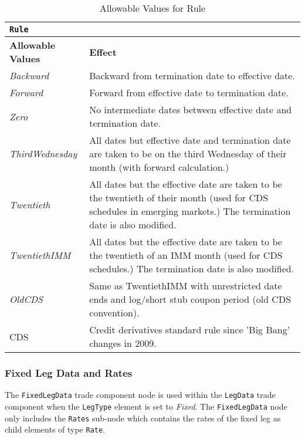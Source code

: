 \begin{table}[H]
\centering
\begin{tabular}{|l|p{6cm}|}
\hline
\multicolumn{2}{|l|}{\lstinline!Rule!}                    \\ \hline
\textbf{Allowable Values}                   & \textbf{Effect}                       \\ \hline
\emph{Backward}   &   Backward from termination date to effective date.   \\ \hline
\emph{Forward}   &   Forward from effective date to termination date.  \\ \hline
\emph{Zero}   &   No intermediate dates between effective date and termination date.  \\ \hline
\emph{ThirdWednesday}   &   All dates but effective date and
                          termination date are taken to be on the
                          third Wednesday of their month (with forward calculation.) \\ \hline
\emph{Twentieth}   &   All dates but the effective date are taken to be the twentieth of their month (used for CDS schedules in emerging markets.)  The termination date is also modified. \\ \hline
\emph{TwentiethIMM}   &   All dates but the effective date are  taken to be the twentieth of an IMM month (used for CDS schedules.)  The termination date is also modified. \\ \hline
\emph{OldCDS}   &   Same as TwentiethIMM with unrestricted date ends and log/short stub coupon period (old CDS convention).\\ \hline
CDS   &   Credit derivatives standard rule since 'Big Bang' changes in 2009.\\ \hline
\end{tabular}
  \caption{Allowable Values for Rule}
  \label{tab:rule}
\end{table}

\subsubsection{Fixed Leg Data and Rates}
\label{ss:fixedleg_data}

The \lstinline!FixedLegData! trade component node is used within the \lstinline!LegData! trade component when the
\lstinline!LegType! element is set to \emph{Fixed}. The \lstinline!FixedLegData! node only includes the
\lstinline!Rates! sub-node which contains the rates of the fixed leg as child elements of type \lstinline!Rate!.

